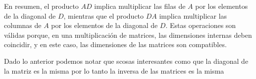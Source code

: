 \documentclass[a4paper,12pt]{article}
\begin{document}
En resumen, el producto \(AD\) implica multiplicar las filas de \(A\) por los elementos de la diagonal de \(D\), mientras que el producto \(DA\) implica multiplicar las columnas de \(A\) por los elementos de la diagonal de \(D\). Estas operaciones son válidas porque, en una multiplicación de matrices, las dimensiones internas deben coincidir, y en este caso, las dimensiones de las matrices son compatibles.

Dado lo anterior podemos notar que scosas interesantes como que la diagonal de la matriz es la misma por lo tanto la inversa de las matrices es la misma
\end{document}
